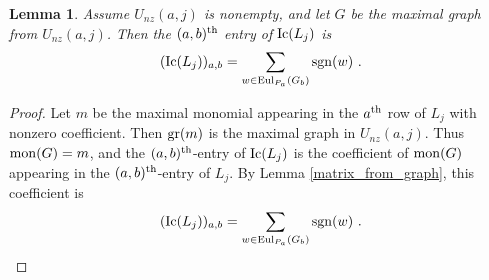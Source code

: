 \documentclass{amsproc}
\newtheorem{lemma}[theorem]{Lemma}
\theoremstyle{definition}
\theoremstyle{remark}
\numberwithin{equation}{section}
\newcommand{\sgn}{{\rm sgn}}
\newcommand{\Ic}{{\rm Ic}}
\newcommand{\gr}{{\rm gr}}
\newcommand{\mon}{{\rm mon}}
\newcommand{\uni}{{\rm Eul}}
\begin{document}
\begin{lemma}\label{Ic_entries}
Assume $U_{nz}(a,j)$ is nonempty, and let $G$ be the maximal graph from $U_{nz}(a,j)$. Then the $(a,b)^{\rm th}$ entry of $\Ic(L_j)$ is
\[(\Ic(L_j))_{a,b}=\sum_{w\in \uni_{P_a}(G_b)}\sgn(w)\ .\]
\end{lemma}

\begin{proof}
Let $m$ be the maximal monomial appearing in the $a^{\rm th}$ row of $L_j$ with nonzero coefficient. Then $\gr(m)$ is the maximal graph in $U_{nz}(a,j)$. Thus $\mon(G)=m$, and the $(a, b)^{\rm th}$-entry of $\Ic(L_j)$ is the coefficient of $\mon(G)$ appearing in the $(a, b)^{\rm th}$-entry of $L_j$. 
By Lemma \ref{matrix_from_graph}, this coefficient is
\[(\Ic(L_j))_{a,b}=\sum_{w\in \uni_{P_a}(G_b)}\sgn(w)\ .\]
\end{proof}
\end{document}
